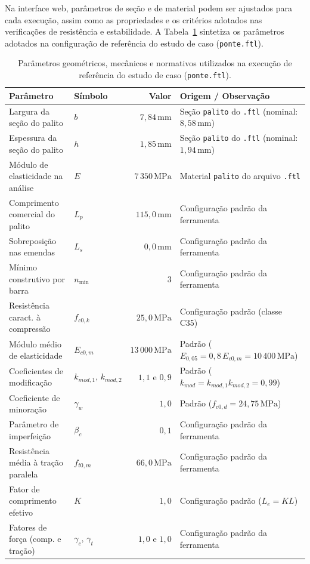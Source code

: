 Na interface web, parâmetros de seção e de material podem ser ajustados para cada execução, assim como as propriedades e os critérios adotados nas verificações de resistência e estabilidade. A Tabela~\ref{tab:parametros-pre-dimensionamento} sintetiza os parâmetros adotados na configuração de referência do estudo de caso (\texttt{ponte.ftl}).

\begin{table}[H]
    \centering
    \caption{Parâmetros geométricos, mecânicos e normativos utilizados na execução de referência do estudo de caso (\texttt{ponte.ftl}).}
    \label{tab:parametros-pre-dimensionamento}
    \small
    \begin{tabular}{llrl}
        \hline
        \textbf{Parâmetro} & \textbf{Símbolo} & \textbf{Valor} & \textbf{Origem / Observação} \\
        \hline
        Largura da seção do palito & \(b\) & \(7,84\,\mathrm{mm}\) & Seção \texttt{palito} do \texttt{.ftl} (nominal: \(8,58\,\mathrm{mm}\)) \\
        Espessura da seção do palito & \(h\) & \(1,85\,\mathrm{mm}\) & Seção \texttt{palito} do \texttt{.ftl} (nominal: \(1,94\,\mathrm{mm}\)) \\
        Módulo de elasticidade na análise & \(E\) & \(7\,350\,\mathrm{MPa}\) & Material \texttt{palito} do arquivo \texttt{.ftl} \\
        Comprimento comercial do palito & \(L_p\) & \(115,0\,\mathrm{mm}\) & Configuração padrão da ferramenta \\
        Sobreposição nas emendas & \(L_s\) & \(0,0\,\mathrm{mm}\) & Configuração padrão da ferramenta \\
        Mínimo construtivo por barra & \(n_{\min}\) & \(3\) & Configuração padrão da ferramenta \\
        Resistência caract. à compressão & \(f_{c0,k}\) & \(25,0\,\mathrm{MPa}\) & Configuração padrão (classe C35) \\
        Módulo médio de elasticidade & \(E_{c0,m}\) & \(13\,000\,\mathrm{MPa}\) & Padrão (\(E_{0,05}=0,8\,E_{c0,m}=10\,400\,\mathrm{MPa}\)) \\
        Coeficientes de modificação & \(k_{mod,1},\,k_{mod,2}\) & \(1,1\text{ e }0,9\) & Padrão (\(k_{mod}=k_{mod,1}k_{mod,2}=0,99\)) \\
        Coeficiente de minoração & \(\gamma_w\) & \(1,0\) & Padrão (\(f_{c0,d}=24,75\,\mathrm{MPa}\)) \\
        Parâmetro de imperfeição & \(\beta_c\) & \(0,1\) & Configuração padrão da ferramenta \\
        Resistência média à tração paralela & \(f_{t0,m}\) & \(66,0\,\mathrm{MPa}\) & Configuração padrão da ferramenta \\
        Fator de comprimento efetivo & \(K\) & \(1,0\) & Configuração padrão (\(L_e = K L\)) \\
        Fatores de força (comp. e tração) & \(\gamma_c,\,\gamma_t\) & \(1,0\text{ e }1,0\) & Configuração padrão da ferramenta \\
        \hline
    \end{tabular}
\end{table}

